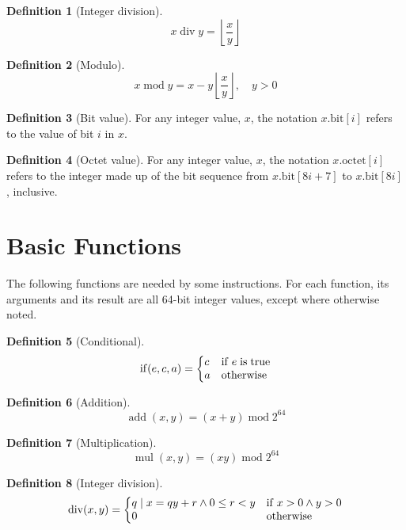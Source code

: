 \documentclass[a4paper,10pt]{article}
\newcommand{\octno}[2]{#1.\mathrm{octet}[#2]}
\newcommand{\bitno}[2]{#1.\mathrm{bit}[#2]}
\DeclareMathOperator{\Mod}{mod}
\DeclareMathOperator{\Add}{add}
\DeclareMathOperator{\Mul}{mul}
\DeclareMathOperator{\Div}{div}
\DeclareMathOperator{\IfThEl}{if}
\newcommand{\modulo}[2]{#1 \Mod #2}
\newcommand{\intdiv}[2]{#1 \Div #2}
\theoremstyle{definition}
\newtheorem{definition}{Definition}
\begin{document}
\begin{definition}[Integer division]
  \[ \intdiv{x}{y} = \left \lfloor \frac{x}{y} \right \rfloor \]
\end{definition}

\begin{definition}[Modulo]
  \[ \modulo{x}{y} = x - y \left \lfloor \frac{x}{y} \right \rfloor, \quad y > 0 \]
\end{definition}

\begin{definition}[Bit value]
For any integer value, $x$, the notation $\bitno{x}{i}$ refers to the value of bit $i$ in $x$.
\end{definition}

\begin{definition}[Octet value]
For any integer value, $x$, the notation $\octno{x}{i}$ refers to the integer made up of the bit sequence from $\bitno{x}{8i+7}$ to $\bitno{x}{8i}$, inclusive.
\end{definition}

\section{Basic Functions}
\label{sec:function-definitions}

The following functions are needed by some instructions.
For each function, its arguments and its result are all 64-bit integer values, except where otherwise noted.

\begin{definition}[Conditional]
  \[ \IfThEl(e, c, a) = \left\{
      \begin{array}{@{}ll@{}}
        c & \mathrm{if} \; e \; \mathrm{is} \; \mathrm{true} \\
        a & \mathrm{otherwise}
      \end{array}
    \right. \]
\end{definition}

\begin{definition}[Addition]
  \[ \Add(x, y) = \modulo{(x + y)}{2^{64}} \]
\end{definition}

\begin{definition}[Multiplication]
  \[ \Mul(x, y) = \modulo{(x y)}{2^{64}} \]
\end{definition}

\begin{definition}[Integer division]
  \[ \Div(x, y) = 
    \left\{
      \begin{array}{@{}ll@{}}
        q \mid x = qy + r \wedge 0 \leq r < y & \mathrm{if} \; x > 0 \wedge y > 0 \\
        0 & \textrm{otherwise}
      \end{array}
    \right. \]
\end{definition}
\end{document}
